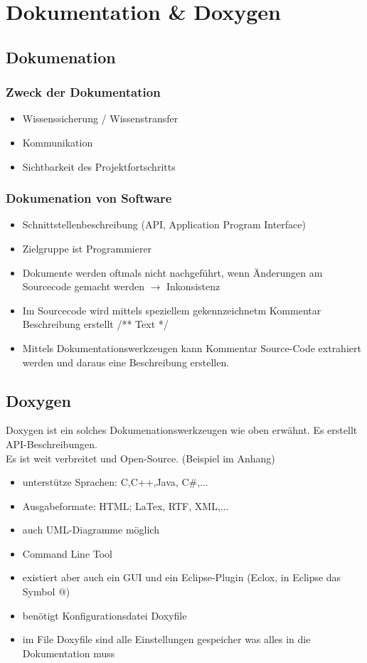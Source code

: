 \section{Dokumentation \& Doxygen}
\subsection{Dokumenation}
\subsubsection{Zweck der Dokumentation}
\begin{itemize}
	\item Wissenssicherung / Wissenstransfer
	\item Kommunikation
	\item Sichtbarkeit des Projektfortschritts
\end{itemize}
\subsubsection{Dokumenation von Software}
\begin{itemize}
	\item Schnittstellenbeschreibung (API, Application Program Interface)
	\item Zielgruppe ist Programmierer
	\item Dokumente werden oftmals nicht nachgeführt, wenn Änderungen am Sourcecode gemacht werden $\rightarrow$ Inkonsistenz
	\item Im Sourcecode wird mittels speziellem gekennzeichnetm Kommentar Beschreibung erstellt /** Text */
	\item Mittels Dokumentationswerkzeugen kann Kommentar Source-Code extrahiert werden und daraus eine Beschreibung erstellen.  
\end{itemize}
\subsection{Doxygen}
Doxygen ist ein solches Dokumenationswerkzeugen wie oben erwähnt. Es erstellt API-Beschreibungen.\\
Es ist weit verbreitet und Open-Source. (Beispiel im Anhang)
\begin{itemize}
	\item unterstütze Sprachen: C,C++,Java, C\#,...
	\item Ausgabeformate: HTML; LaTex, RTF, XML,...
	\item auch UML-Diagramme möglich
	\item Command Line Tool
	\item existiert aber auch ein GUI und ein Eclipse-Plugin (Eclox, in Eclipse das Symbol @)
	\item benötigt Konfigurationsdatei Doxyfile 
	\item im File Doxyfile sind alle Einstellungen gespeicher was alles in die Dokumentation muss
\end{itemize}

